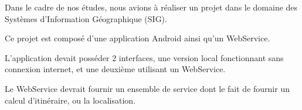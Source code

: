 Dans le cadre de nos études, nous avions à réaliser un projet dans le domaine des Systèmes d'Information Géographique (SIG).

Ce projet est composé d'une application Android ainsi qu'un WebService.

L'application devait posséder 2 interfaces, une version local fonctionnant sans connexion internet, et une deuxième utilisant un WebService.

Le WebService devrait fournir un ensemble de service dont le fait de fournir un calcul d'itinéraire, ou la localisation.